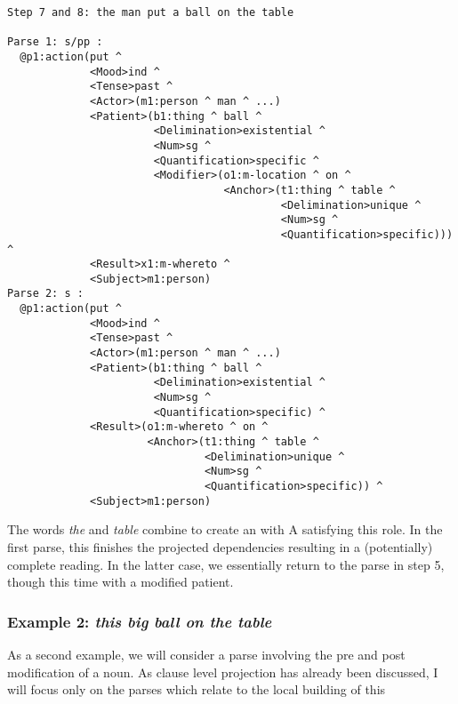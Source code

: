 \begin{verbatim}
Step 7 and 8: the man put a ball on the table

Parse 1: s/pp : 
  @p1:action(put ^ 
             <Mood>ind ^ 
             <Tense>past ^ 
             <Actor>(m1:person ^ man ^ ...)
             <Patient>(b1:thing ^ ball ^ 
                       <Delimination>existential ^ 
                       <Num>sg ^ 
                       <Quantification>specific ^ 
                       <Modifier>(o1:m-location ^ on ^ 
                                  <Anchor>(t1:thing ^ table ^ 
                                           <Delimination>unique ^ 
                                           <Num>sg ^ 
                                           <Quantification>specific))) ^ 
             <Result>x1:m-whereto ^ 
             <Subject>m1:person)
Parse 2: s : 
  @p1:action(put ^ 
             <Mood>ind ^ 
             <Tense>past ^ 
             <Actor>(m1:person ^ man ^ ...)
             <Patient>(b1:thing ^ ball ^ 
                       <Delimination>existential ^ 
                       <Num>sg ^ 
                       <Quantification>specific) ^ 
             <Result>(o1:m-whereto ^ on ^ 
                      <Anchor>(t1:thing ^ table ^ 
                               <Delimination>unique ^ 
                               <Num>sg ^ 
                               <Quantification>specific)) ^ 
             <Subject>m1:person)
\end{verbatim}
The words \emph{the} and \emph{table} combine to create an  with A satisfying this   role. In the first parse, this finishes the projected dependencies resulting in a (potentially) complete  reading. In the latter case, we essentially return to the parse in step 5, though this time with a modified patient. 

\subsubsection{Example 2: \emph{ this big ball on the table}}
As a second example, we will consider a parse involving the pre and post modification of a noun. As clause level projection has already been discussed, I will focus only on the parses which relate to the local building of this 

